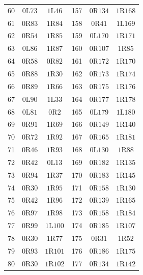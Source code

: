 \begin{longtable}{@{}rcc@{\qquad\qquad}rcc@{}}
60 & $0\mathrm{L}73$ & $1\mathrm{L}46$ & 157 & $0\mathrm{R}134$ & $1\mathrm{R}168$ \\
61 & $0\mathrm{R}83$ & $1\mathrm{R}84$ & 158 & $0\mathrm{R}41$ & $1\mathrm{L}169$ \\
62 & $0\mathrm{R}54$ & $1\mathrm{R}85$ & 159 & $0\mathrm{L}170$ & $1\mathrm{R}171$ \\
63 & $0\mathrm{L}86$ & $1\mathrm{R}87$ & 160 & $0\mathrm{R}107$ & $1\mathrm{R}85$ \\
64 & $0\mathrm{R}58$ & $0\mathrm{R}82$ & 161 & $0\mathrm{R}172$ & $1\mathrm{R}170$ \\
65 & $0\mathrm{R}88$ & $1\mathrm{R}30$ & 162 & $0\mathrm{R}173$ & $1\mathrm{R}174$ \\
66 & $0\mathrm{R}89$ & $1\mathrm{R}66$ & 163 & $0\mathrm{R}175$ & $1\mathrm{R}176$ \\
67 & $0\mathrm{L}90$ & $1\mathrm{L}33$ & 164 & $0\mathrm{R}177$ & $1\mathrm{R}178$ \\
68 & $0\mathrm{L}81$ & $0\mathrm{R}2$ & 165 & $0\mathrm{L}179$ & $1\mathrm{L}180$ \\
69 & $0\mathrm{R}91$ & $1\mathrm{R}69$ & 166 & $0\mathrm{R}149$ & $1\mathrm{R}140$ \\
70 & $0\mathrm{R}72$ & $1\mathrm{R}92$ & 167 & $0\mathrm{R}165$ & $1\mathrm{R}181$ \\
71 & $0\mathrm{R}46$ & $1\mathrm{R}93$ & 168 & $0\mathrm{L}130$ & $1\mathrm{R}88$ \\
72 & $0\mathrm{R}42$ & $0\mathrm{L}13$ & 169 & $0\mathrm{R}182$ & $1\mathrm{R}135$ \\
73 & $0\mathrm{R}94$ & $1\mathrm{R}37$ & 170 & $0\mathrm{R}183$ & $1\mathrm{R}145$ \\
74 & $0\mathrm{R}30$ & $1\mathrm{R}95$ & 171 & $0\mathrm{R}158$ & $1\mathrm{R}130$ \\
75 & $0\mathrm{R}42$ & $1\mathrm{R}96$ & 172 & $0\mathrm{R}139$ & $1\mathrm{R}165$ \\
76 & $0\mathrm{R}97$ & $1\mathrm{R}98$ & 173 & $0\mathrm{R}158$ & $1\mathrm{R}184$ \\
77 & $0\mathrm{R}99$ & $1\mathrm{L}100$ & 174 & $0\mathrm{R}185$ & $1\mathrm{R}107$ \\
78 & $0\mathrm{R}30$ & $1\mathrm{R}77$ & 175 & $0\mathrm{R}31$ & $1\mathrm{R}52$ \\
79 & $0\mathrm{R}93$ & $1\mathrm{R}101$ & 176 & $0\mathrm{R}186$ & $1\mathrm{R}175$ \\
80 & $0\mathrm{R}30$ & $1\mathrm{R}102$ & 177 & $0\mathrm{R}134$ & $1\mathrm{R}142$ \\

\end{longtable}
